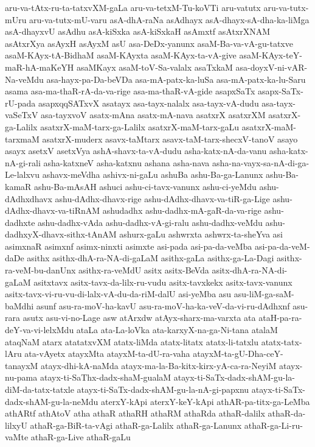 {aru-va-tAtx-ru-ta-tatxvXM-gaLa
aru-va-tetxM-Tu-koVTi
aru-vatutx
aru-va-tutx-mUru
aru-va-tutx-mU-varu
asA-dhA-raNa
asAdhayx
asA-dhayx-sA-dha-ka-liMga
asA-dhayxvU
asAdhu
asA-kiSxka
asA-kiSxkaH
asAmxtf
asAtxrXNAM
asAtxrXya
asAyxH
asAyxM
asU
asa-DeDx-yanunx
asaM-Ba-va-vA-gu-tatxve
asaM-KAyx-tA-BidhaM
asaM-KAyxta
asaM-KAyx-ta-vA-give
asaM-KAyx-teY-maR-hA-maKeYH
asaMKayx
asaM-toV-Sa-valalx
asaTxkaM
asa-doyxV-ni-vAR-Na-veMdu
asa-hayx-pa-Da-beVDa
asa-mA-patx-ka-luSa
asa-mA-patx-ka-lu-Saru
asama
asa-ma-thaR-rA-da-va-rige
asa-ma-thaR-vA-gide
asapxSaTx
asapx-SaTx-rU-pada
asapxqqSATxvX
asatayx
asa-tayx-nalalx
asa-tayx-vA-dudu
asa-tayx-vaSeTxV
asa-tayxvoV
asatx-mAna
asatx-mA-nava
asatxrX
asatxrXM
asatxrX-ga-Lalilx
asatxrX-maM-tarx-ga-Lalilx
asatxrX-maM-tarx-gaLu
asatxrX-maM-tarxmaM
asatxrX-muderx
asavx-taMtarx
asavx-taM-tarx-shecxV-tanoV
asayo
asayx
asetxV
asetxVya
ashA-shavx-ta-vA-dudu
asha-katx-nA-da-vanu
asha-katx-nA-gi-rali
asha-katxneV
asha-katxnu
ashana
asha-nava
asha-na-vayx-sa-nA-di-ga-Le-lalxvu
ashavx-meVdha
ashivx-ni-gaLu
ashuBa
ashu-Ba-ga-Lanunx
ashu-Ba-kamaR
ashu-Ba-mAsAH
ashuci
ashu-ci-tavx-vanunx
ashu-ci-yeMdu
ashu-dAdhxdhavx
ashu-dAdhx-dhavx-rige
ashu-dAdhx-dhavx-va-tiR-ga-Lige
ashu-dAdhx-dhavx-va-tiRnAM
ashudadhx
ashu-dadhx-mA-gaR-da-va-rige
ashu-dadhxte
ashu-dadhx-vAda
ashu-dadhx-vA-gi-ralu
ashu-dadhx-veMdu
ashu-dadhxyX-dhavx-sithx-tAnAM
ashurx-gaLu
ashwrxta
ashwrx-ta-sheYva
asi
asimxnaR
asimxnf
asimx-ninxti
asimxte
asi-pada
asi-pa-da-veMba
asi-pa-da-veM-daDe
asithx
asithx-dhA-ra-NA-di-gaLaM
asithx-gaLa
asithx-ga-La-Dagi
asithx-ra-veM-bu-danUnx
asithx-ra-veMdU
asitx
asitx-BeVda
asitx-dhA-ra-NA-di-gaLaM
asitxtavx
asitx-tavx-da-lilx-ru-vudu
asitx-tavxkekx
asitx-tavx-vanunx
asitx-tavx-vi-ru-vu-di-lalx-vA-du-da-riM-dalU
asi-yeMba
asu
asu-liM-ga-saM-baMdhi
asunf
asu-ra-moV-ha-kavU
asu-ra-moV-ha-ka-veV-da-vi-ru-dAdhxnf
asu-rara
asutx
asu-vi-no-Lage
asw
atArxdw
atAyx-sharx-ma-varxta
ata
ataH-pa-ra-deY-va-vi-lelxMdu
ataLa
ata-La-loVka
ata-karxyX-na-ga-Ni-tana
atalaM
ataqNaM
atarx
atatatxvXM
atatx-liMda
atatx-litatx
atatx-li-tatxlu
atatx-tatx-lAru
ata-vAyetx
atayxMta
atayxM-ta-dU-ra-vaha
atayxM-ta-gU-Dha-ceY-tanayxM
atayx-dhi-kA-naMda
atayx-ma-la-Ba-kitx-kirx-yA-ca-ra-NeyiM
atayx-nu-pama
atayx-ti-SaThx-dadx-shaM-gualaM
atayx-ti-SaTx-dadx-shAM-gu-la-diM-da-tatx-tatxle
atayx-ti-SaTx-dadx-shAM-gu-la-nA-gi-papxnu
atayx-ti-SaTx-dadx-shAM-gu-la-neMdu
aterxY-kApi
aterxY-keY-kApi
athAR-pa-titx-ga-LeMba
athARtf
athAtoV
atha
athaR
athaRH
athaRM
athaRda
athaR-dalilx
athaR-da-lilxyU
athaR-ga-BiR-ta-vAgi
athaR-ga-Lalilx
athaR-ga-Lanunx
athaR-ga-Li-ru-vaMte
athaR-ga-Live
athaR-gaLu
}
